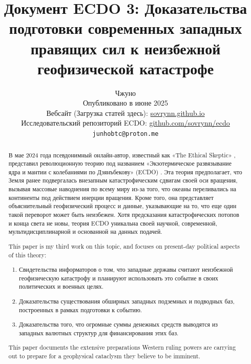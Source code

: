 \documentclass[10pt,twocolumn,letterpaper]{article}
\begin{document}
\title{Документ ECDO 3: Доказательства подготовки современных западных правящих сил к неизбежной геофизической катастрофе}

\author{Чжуно\\
Опубликовано в июне 2025\\
Вебсайт (Загрузка статей здесь): \href{https://sovrynn.github.io}{sovrynn.github.io}\\
Исследовательский репозиторий ECDO: \href{https://github.com/sovrynn/ecdo}{github.com/sovrynn/ecdo}\\
{\tt\small junhobtc@proton.me}
}

\maketitle

\begin{abstract}
В мае 2024 года псевдонимный онлайн-автор, известный как «The Ethical Skeptic» \cite{0}, представил революционную теорию под названием «Экзотермическое развязывание ядра и мантии с колебаниями по Дзянъбекову» (ECDO) \cite{1}. Эта теория предполагает, что Земля ранее подвергалась внезапным катастрофическим сдвигам своей оси вращения, вызывая массовые наводнения по всему миру из-за того, что океаны переливались на континенты под действием инерции вращения. Кроме того, она представляет объяснительный геофизический процесс и данные, указывающие на то, что еще один такой переворот может быть неизбежен. Хотя предсказания катастрофических потопов и конца света не новы, теория ECDO уникальна своей научной, современной, мультидисциплинарной и основанной на данных подачей.

This paper is my third work \cite{2,3} on this topic, and focuses on present-day political aspects of this theory:
\begin{flushleft}
\begin{enumerate}
    \item Свидетельства информаторов о том, что западные державы считают неизбежной геофизическую катастрофу и планируют использовать это событие в своих политических и военных целях.
    \item Доказательства существования обширных западных подземных и подводных баз, построенных в рамках подготовки к событию.
    \item Доказательства того, что огромные суммы денежных средств выводятся из западных валютных структур для финансирования этих баз.
\end{enumerate}
\end{flushleft}

This paper documents the extensive preparations Western ruling powers are carrying out to prepare for a geophysical cataclysm they believe to be imminent.
\end{abstract}
\end{document}
